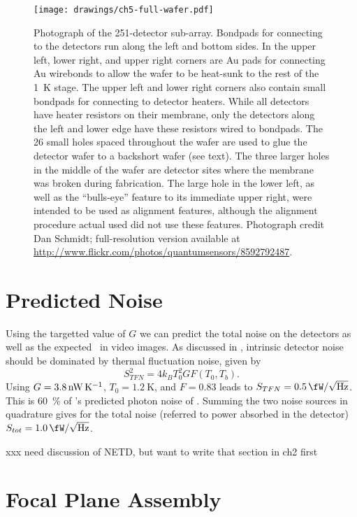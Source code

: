 \begin{figure}
\centering
\texttt{[image: drawings/ch5-full-wafer.pdf]}
\caption{
  Photograph of the 251-detector sub-array.
  Bondpads for connecting to the detectors run along the left and bottom sides.
  In the upper left, lower right, and upper right corners are Au pads for connecting Au wirebonds to allow the wafer to be heat-sunk to the rest of the \SI{1}{\K} stage.
  The upper left and lower right corners also contain small bondpads for connecting to detector heaters.
  While all detectors have heater resistors on their membrane, only the detectors along the left and lower edge have these resistors wired to bondpads.
  The 26 small holes spaced throughout the wafer are used to glue the detector wafer to a backshort wafer (see text).
  The three larger holes in the middle of the wafer are detector sites where the membrane was broken during fabrication.
  The large hole in the lower left, as well as the ``bulls-eye'' feature to its immediate upper right, were intended to be used as alignment features, although the alignment procedure actual used did not use these features.
  Photograph credit Dan Schmidt; full-resolution version available at \protect\url{http://www.flickr.com/photos/quantumsensors/8592792487}.
}
\label{fig:ch5-full-wafer}
\end{figure}

\section{Predicted Noise} \label{sec:ch5-predicted-noise}

Using the targetted value of $G$ we can predict the total noise on the detectors as well as the expected \NETD\ in video images.
As discussed in , intrinsic detector noise should be dominated by thermal fluctuation noise, given by
\begin{equation}
  S^2_{TFN} = 4 k_B T_0^2 G F(T_0, T_b).
\end{equation}
Using $G = \SI{3.8}{\nW\per\K}$, $T_0 = \SI{1.2}{\K}$, and $F = 0.83$ leads to $S_{TFN} = \Pnoisef{0.5}$.
This is \SI{60}{\percent} of 's predicted photon noise of .
Summing the two noise sources in quadrature gives for the total noise (referred to power absorbed in the detector) $S_{tot} = \Pnoisef{1.0}$.

xxx need discussion of NETD, but want to write that section in ch2 first

\section{Focal Plane Assembly} \label{sec:ch5-focal-plane}

